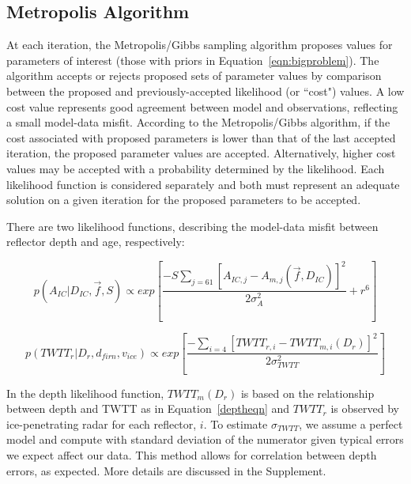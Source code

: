 \subsection{Metropolis Algorithm}\label{metrop}
At each iteration, the Metropolis/Gibbs sampling algorithm \citep{metropolis1953,hastings1970} proposes values for parameters of interest (those with priors in Equation~\ref{eqn:bigproblem}). The algorithm accepts or rejects proposed sets of parameter values by comparison between the proposed and previously-accepted likelihood (or ``cost") values. A low cost value represents good agreement between model and observations, reflecting a small model-data misfit. According to the Metropolis/Gibbs algorithm, if the cost associated with proposed parameters is lower than that of the last accepted iteration, the proposed parameter values are accepted. Alternatively, higher cost values may be accepted with a probability determined by the likelihood. Each likelihood function is considered separately and both must represent an adequate solution on a given iteration for the proposed parameters to be accepted.


There are two likelihood functions, describing the model-data misfit between reflector depth and age, respectively:


\begin{equation}\label{eqn:loglikeage}
p(A_{IC} | D_{IC},\vec{f},S) \propto exp[\frac{-S\sum_{j = 61}[A_{IC,j} - A_{m,j}(\vec{f},D_{IC})]^2}{2\sigma_A^2} + r^6]
\end{equation}

\begin{equation}\label{eqn:loglikedepth}
p(TWTT_r | D_r,d_{firn},v_{ice} ) \propto exp[\frac{-\sum_{i=4}[TWTT_{r,i} - TWTT_{m,i}(D_r)]^2}{2\sigma_{TWTT}^2}]
\end{equation}


In the depth likelihood function, $TWTT_m(D_r)$ is based on the relationship between depth and TWTT as in Equation~\ref{deptheqn} and $TWTT_r$ is observed by ice-penetrating radar for each reflector, $i$. To estimate $\sigma_{TWTT}$, we assume a perfect model and compute with standard deviation of the numerator given typical errors we expect affect our data. This method allows for correlation between depth errors, as expected. More details are discussed in the Supplement.


